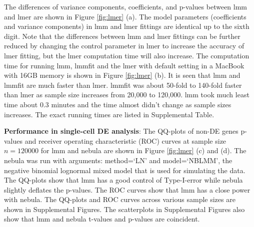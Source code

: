 \documentclass[
]{article}
\begin{document}
The differences of variance components, coefficients, and p-values
between lmm and lmer are shown in Figure \ref{fig:lmer} (a). The model
parameters (coefficients and variance components) in lmm and lmer
fittings are identical up to the sixth digit. Note that the differences
between lmm and lmer fittings can be further reduced by changing the
control parameter in lmer to increase the accuracy of lmer fitting, but
the lmer computation time will also increase. The computation time for
running lmm, lmmfit and the lmer with default setting in a MacBook with
16GB memory is shown in Figure \ref{fig:lmer} (b). It is seen that lmm
and lmmfit are much faster than lmer. lmmfit was about 50-fold to
140-fold faster than lmer as sample size increases from 20,000 to
120,000. lmm took much least time about 0.3 minutes and the time almost
didn't change as sample sizes increases. The exact running times are
listed in Supplemental Table.

\textbf{Performance in single-cell DE analysis}: The QQ-plots of non-DE
genes p-values and receiver operating characteristic (ROC) curves at
sample size \(n=120000\) for lmm and nebula are shown in Figure
\ref{fig:lmer} (c) and (d). The nebula was run with arguments:
method=`LN' and model=`NBLMM', the negative binomial lognormal mixed
model that is used for simulating the data. The QQ-plots show that lmm
has a good control of Type-I-error while nebula slightly deflates the
p-values. The ROC curves show that lmm has a close power with nebula.
The QQ-plots and ROC curves across various sample sizes are shown in
Supplemental Figures. The scatterplots in Supplemental Figures also show
that lmm and nebula t-values and p-values are coincident.
\end{document}
